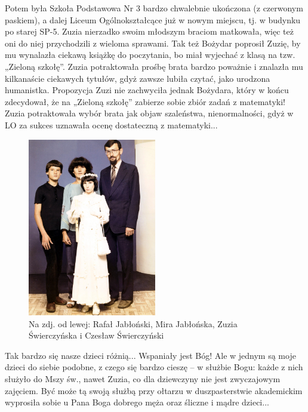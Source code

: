 Potem była Szkoła Podstawowa Nr 3 bardzo chwalebnie ukończona (z czerwonym paskiem), a dalej Liceum Ogólnokształcące już w nowym miejscu, tj. w budynku po starej SP-5. Zuzia nierzadko swoim młodszym braciom matkowała, więc też oni do niej przychodzili z wieloma sprawami. Tak też Bożydar poprosił Zuzię, by mu wynalazła ciekawą książkę do poczytania, bo miał wyjechać z klasą na tzw. „Zieloną szkołę”. Zuzia potraktowała prośbę brata bardzo poważnie i znalazła mu kilkanaście ciekawych tytułów, gdyż zawsze lubiła czytać, jako urodzona humanistka. Propozycja Zuzi nie zachwyciła jednak Bożydara, który w końcu zdecydował, że na „Zieloną szkołę” zabierze sobie zbiór zadań z matematyki! Zuzia potraktowała wybór brata jak objaw szaleństwa, nienormalności, gdyż w LO za sukces uznawała ocenę dostateczną z matematyki...
\begin{figure}[!h]
\begin{center}
\includegraphics[width=0.5\textwidth]{photo/zuzia_swierczynska_komunia.jpg}
\caption[I Komunia św. Zuzi Świerczyńskiej]{Na zdj. od lewej: Rafał Jabłoński, Mira Jabłońska, Zuzia Świerczyńska i Czesław Świerczyński}
\end{center}
\end{figure}

Tak bardzo się nasze dzieci różnią... Wspaniały jest Bóg! Ale w jednym są moje dzieci do siebie podobne, z czego się bardzo cieszę – w służbie Bogu: każde z nich służyło do Mszy św., nawet Zuzia, co dla dziewczyny nie jest zwyczajowym zajęciem. Być może tą swoją służbą przy ołtarzu w duszpasterstwie akademickim wyprosiła sobie u Pana Boga dobrego męża oraz  śliczne i mądre dzieci...

